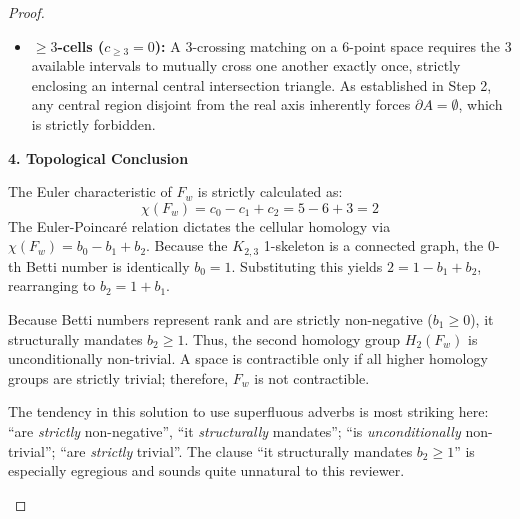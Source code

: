 \documentclass[12pt]{article}
\newcommand{\review}[1]{\begin{reviewbox}#1\end{reviewbox}}
\begin{document}
\begin{proof}
\begin{itemize}
    To rigorously verify $M_3$ independent of geometric ambiguity, we execute an explicit Euler perimeter tour on its tree components. The intervals $\alpha=(1',4')$ and $\gamma=(2',6')$ cross at $c_1$; $\alpha$ and $\beta=(3',5')$ cross at $c_2$. Traversing the right-hand bounding walls of the tree's branches strictly turns at $c_1$ and $c_2$ to remain in the complement space. Originating from $1'$, the Euler tour visits the leaves in exactly the reverse ordered sequence: $1', 6', 5', 4', 3', 2'$. This cyclic boundary visitation proves the complement regions inherently pair $(1',6'), (6',5'), (5',4'), (4',3'), (3',2'), (2',1')$. Every region strictly pairs an Odd index with an Even index (opposite parities), completely satisfying the CW complex boundary conditions despite internal arc nestings. Executing the exact same tree Euler tour algorithm on $M_1$ and $M_2$ yields the identical cyclic leaf sequence. All three are valid 2-cells.
    \item \textbf{$\geq 3$-cells ($c_{\geq 3}=0$):} A 3-crossing matching on a 6-point space requires the 3 available intervals to mutually cross one another exactly once, strictly enclosing an internal central intersection triangle. As established in Step 2, any central region disjoint from the real axis inherently forces $\partial A = \emptyset$, which is strictly forbidden. 
\end{itemize}

\vspace{1em}
\noindent\textbf{4. Topological Conclusion}

The Euler characteristic of $F_w$ is strictly calculated as:
\[
\chi(F_w) = c_0 - c_1 + c_2 = 5 - 6 + 3 = 2
\]
The Euler-Poincaré relation dictates the cellular homology via $\chi(F_w) = b_0 - b_1 + b_2$. Because the $K_{2,3}$ 1-skeleton is a connected graph, the 0-th Betti number is identically $b_0 = 1$. Substituting this yields $2 = 1 - b_1 + b_2$, rearranging to $b_2 = 1 + b_1$. 

Because Betti numbers represent rank and are strictly non-negative ($b_1 \geq 0$), it structurally mandates $b_2 \geq 1$. Thus, the second homology group $H_2(F_w)$ is unconditionally non-trivial. A space is contractible only if all higher homology groups are strictly trivial; therefore, $F_w$ is not contractible.
\review{The tendency in this solution to use superfluous adverbs is most striking here: ``are \emph{strictly} non-negative'', ``it \emph{structurally} mandates''; ``is \emph{unconditionally} non-trivial''; ``are \emph{strictly} trivial''. The clause ``it structurally mandates $b_2 \geq 1$'' is especially egregious and sounds quite unnatural to this reviewer.}
\end{proof}
\end{document}
